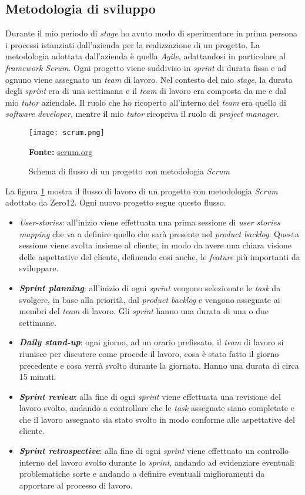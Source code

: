 \subsection{Metodologia di sviluppo}
Durante il mio periodo di \textit{stage} ho avuto modo di sperimentare in prima persona i processi istanziati dall'azienda per la realizzazione di un progetto.
La metodologia adottata dall'azienda è quella \textit{Agile}, adattandosi in particolare al \textit{framework Scrum}.
Ogni progetto viene suddiviso in \textit{sprint} di durata fissa e ad ognuno viene assegnato un \textit{team} di lavoro.
Nel contesto del mio \textit{stage}, la durata degli \textit{sprint} era di una settimana e il \textit{team} di lavoro era composta da me e dal mio \textit{tutor} aziendale.
Il ruolo che ho ricoperto all'interno del \textit{team} era quello di \textit{software developer}, mentre il mio \textit{tutor} ricopriva il ruolo di \textit{project manager}.
\begin{figure}[H]
    \centering
    \texttt{[image: scrum.png]}
    \caption{Schema di flusso di un progetto con metodologia \textit{Scrum}}
    \small \textbf{Fonte:} \url{scrum.org}
    \label{fig:scrum}
\end{figure}
\noindent
La figura \ref{fig:scrum} mostra il flusso di lavoro di un progetto con metodologia \textit{Scrum} adottato da Zero12. Ogni nuovo progetto segue questo flusso. 
\begin{itemize}
    \item \textit{\gls{User-stories}}: all'inizio viene effettuata una prima sessione di \textit{user stories mapping} che va a definire quello che sarà presente nel \textit{product backlog}. Questa sessione viene svolta insieme al cliente, in modo da avere una chiara visione delle aspettative del cliente, definendo cosi anche, le \textit{feature} più importanti da sviluppare.
    \item \textbf{\textit{Sprint planning}}: all'inizio di ogni \textit{sprint} vengono selezionate le \textit{task} da svolgere, in base alla priorità, dal \textit{product backlog} e vengono assegnate ai membri del \textit{team} di lavoro. Gli \textit{sprint} hanno una durata di una o due settimane.
    \item \textbf{\textit{Daily stand-up}}: ogni giorno, ad un orario prefissato, il \textit{team} di lavoro si riunisce per discutere come procede il lavoro, cosa è stato fatto il giorno precedente e cosa verrà svolto durante la giornata. Hanno una durata di circa 15 minuti.
    \item \textbf{\textit{Sprint review}}: alla fine di ogni \textit{sprint} viene effettuata una revisione del lavoro svolto, andando a controllare che le \textit{task} assegnate siano completate e che il lavoro assegnato sia stato svolto in modo conforme alle aspettative del cliente.
    \item \textbf{\textit{Sprint retrospective}}: alla fine di ogni \textit{sprint} viene effettuato un controllo interno del lavoro svolto durante lo \textit{sprint}, andando ad evidenziare eventuali problematiche sorte e andando a definire eventuali miglioramenti da apportare al processo di lavoro.
\end{itemize}
